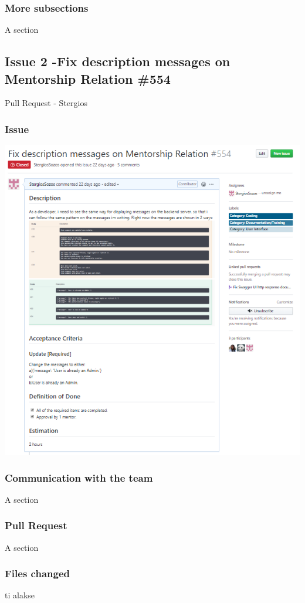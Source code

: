 \documentclass{article}
\begin{document}
\subsubsection{More subsections}
A section

\subsection{Issue 2 -Fix description messages on Mentorship Relation \#554}
Pull Request - Stergios

\subsubsection{Issue}
\includegraphics{issue554}

\subsubsection{Communication with the team}
A section

\subsubsection{Pull Request}
A section 

\subsubsection{Files changed}
ti alakse
\end{document}

